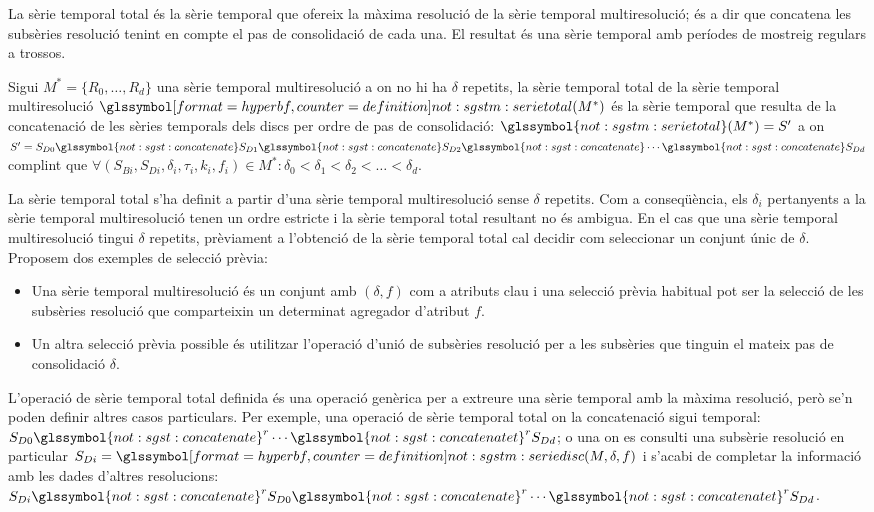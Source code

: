 La sèrie temporal total és la sèrie temporal que ofereix la màxima
resolució de la sèrie temporal multiresolució; és a dir que concatena
les subsèries resolució tenint en compte el pas de consolidació de
cada una. El resultat és una sèrie temporal amb períodes de mostreig
regulars a trossos.
\begin{definition}
  Sigui $M^*=\{R_0,\dotsc,R_{d}\}$ una sèrie temporal multiresolució a
  on no hi ha $\delta$ repetits, la sèrie temporal total de la sèrie
  temporal multiresolució $\glssymboldef{not:sgstm:serietotal}(M^*)$
  és la sèrie temporal que resulta de la concatenació de les sèries
  temporals dels discs per ordre de pas de consolidació:
  $\glssymbol{not:sgstm:serietotal}(M^*)=S'$ a on $S'= S_{D0}
  \glssymbol{not:sgst:concatenate} S_{D1} \glssymbol{not:sgst:concatenate} S_{D2} \glssymbol{not:sgst:concatenate} \dotsb \glssymbol{not:sgst:concatenate}
  S_{Dd}$ complint que $\forall
  (S_{Bi},S_{Di},\delta_i,\tau_i,k_i,f_i) \in M^* : \delta_0 <
  \delta_1 < \delta_2 < \dots < \delta_d$.
\end{definition}

La sèrie temporal total s'ha definit a partir d'una sèrie temporal
multiresolució sense $\delta$ repetits. Com a conseqüència, els
$\delta_i$ pertanyents a la sèrie temporal multiresolució tenen un
ordre estricte i la sèrie temporal total resultant no és ambigua.
En el cas que una sèrie temporal multiresolució tingui $\delta$
repetits, prèviament a l'obtenció de la sèrie temporal total cal
decidir com seleccionar un conjunt únic de $\delta$. Proposem dos
exemples de selecció prèvia:
\begin{itemize}
\item Una sèrie temporal multiresolució és un conjunt amb $(\delta,f)$
  com a atributs clau i una selecció prèvia habitual pot ser la
  selecció de les subsèries resolució que comparteixin un determinat
  agregador d'atribut $f$.
\item Un altra selecció prèvia possible és utilitzar l'operació d'unió
  de subsèries resolució per a les subsèries que tinguin el mateix pas
  de consolidació $\delta$.
\end{itemize}



L'operació de sèrie temporal total definida és una operació genèrica
per a extreure una sèrie temporal amb la màxima resolució, però se'n
poden definir altres casos particulars. Per exemple, una operació de
sèrie temporal total on la concatenació sigui temporal: $S_{D0}
\glssymbol{not:sgst:concatenate}^r \dotsb
\glssymbol{not:sgst:concatenatet}^r S_{Dd}$; o una on es consulti una
subsèrie resolució en particular
$S_{Di}=\glssymboldef{not:sgstm:seriedisc}(M,\delta,f)$ i s'acabi de
completar la informació amb les dades d'altres resolucions: $S_{Di}
\glssymbol{not:sgst:concatenate}^r S_{D0}
\glssymbol{not:sgst:concatenate}^r \dotsb
\glssymbol{not:sgst:concatenatet}^r S_{Dd}$.


